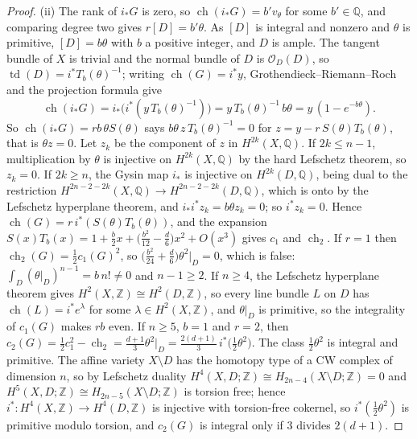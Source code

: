 \documentclass[11pt,reqno]{amsart}
\theoremstyle{plain}
\theoremstyle{definition}
\theoremstyle{remark}
\newcommand{\QQ}{\mathbb{Q}}
\newcommand{\ZZ}{\mathbb{Z}}
\newcommand{\cO}{\mathcal{O}}
\DeclareMathOperator{\ch}{ch}
\begin{document}
\begin{proof}
(ii) The rank of $i_{*}G$ is zero, so $\ch(i_{*}G)=b'v_{\theta}$ for some
$b'\in\QQ$, and comparing degree two gives $r[D]=b'\theta$. As $[D]$ is
integral and nonzero and $\theta$ is primitive, $[D]=b\theta$ with $b$ a
positive integer, and $D$ is ample. The tangent bundle of $X$ is trivial and
the normal bundle of $D$ is $\cO_{D}(D)$, so $\operatorname{td}(D)=
i^{*}T_{b}(\theta)^{-1}$; writing $\ch(G)=i^{*}y$, Grothendieck--Riemann--Roch
and the projection formula give
\[
  \ch(i_{*}G)=i_{*}\bigl(i^{*}(y\,T_{b}(\theta)^{-1})\bigr)
  =y\,T_{b}(\theta)^{-1}\,b\theta=y\,(1-e^{-b\theta}).
\]
So $\ch(i_{*}G)=rb\,\theta S(\theta)$ says $b\theta\,z\,T_{b}(\theta)^{-1}=0$ for
$z=y-r\,S(\theta)T_{b}(\theta)$, that is $\theta z=0$. Let $z_{k}$ be the
component of $z$ in $H^{2k}(X,\QQ)$. If $2k\le n-1$, multiplication by
$\theta$ is injective on $H^{2k}(X,\QQ)$ by the hard Lefschetz theorem, so
$z_{k}=0$. If $2k\ge n$, the Gysin map $i_{*}$ is injective on
$H^{2k}(D,\QQ)$, being dual to the restriction
$H^{2n-2-2k}(X,\QQ)\to H^{2n-2-2k}(D,\QQ)$, which is onto by the Lefschetz
hyperplane theorem, and $i_{*}i^{*}z_{k}=b\theta z_{k}=0$; so $i^{*}z_{k}=0$.
Hence $\ch(G)=r\,i^{*}(S(\theta)T_{b}(\theta))$, and the expansion
$S(x)T_{b}(x)=1+\frac b2x+\bigl(\frac{b^{2}}{12}-\frac d6\bigr)x^{2}+O(x^{3})$
gives $c_{1}$ and $\ch_{2}$. If $r=1$ then $\ch_{2}(G)=\frac12c_{1}(G)^{2}$, so
$\bigl(\frac{b^{2}}{24}+\frac d6\bigr)\theta^{2}|_{D}=0$, which is false: $\int_{D}
(\theta|_{D})^{n-1}=b\,n!\ne0$ and $n-1\ge2$. If $n\ge4$, the Lefschetz
hyperplane theorem gives $H^{2}(X,\ZZ)\cong H^{2}(D,\ZZ)$, so every line bundle
$L$ on $D$ has $\ch(L)=i^{*}e^{\lambda}$ for some $\lambda\in H^{2}(X,\ZZ)$, and
$\theta|_{D}$ is primitive, so the integrality of $c_{1}(G)$ makes $rb$ even.
If $n\ge5$, $b=1$ and $r=2$, then $c_{2}(G)=\frac12c_{1}^{2}-\ch_{2}=
\frac{d+1}{3}\theta^{2}|_{D}=\frac{2(d+1)}{3}\,i^{*}\bigl(\tfrac12\theta^{2}\bigr)$.
The class $\frac12\theta^{2}$ is integral and primitive. The affine variety
$X\setminus D$ has the homotopy type of a CW complex of dimension $n$, so by
Lefschetz duality $H^{4}(X,D;\ZZ)\cong H_{2n-4}(X\setminus D;\ZZ)=0$ and
$H^{5}(X,D;\ZZ)\cong H_{2n-5}(X\setminus D;\ZZ)$ is torsion free; hence
$i^{*}\colon H^{4}(X,\ZZ)\to H^{4}(D,\ZZ)$ is injective with torsion-free
cokernel, so $i^{*}(\frac12\theta^{2})$ is primitive modulo torsion, and
$c_{2}(G)$ is integral only if $3$ divides $2(d+1)$.


\end{proof}
\end{document}
